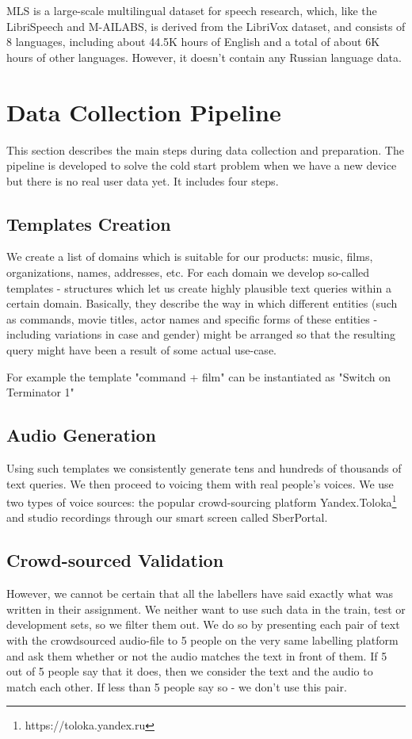 \documentclass[a4paper]{article}
\begin{document}
MLS \cite{pratap2020mls} is a large-scale multilingual dataset for speech research, which, like the LibriSpeech and M-AILABS, is derived from the LibriVox dataset, and consists of 8 languages, including about 44.5K hours of English and a total of about 6K hours of other languages. However, it doesn't contain any Russian language data.


\section{Data Collection Pipeline}

This section describes the main steps during data collection and preparation. The pipeline is developed to solve the cold start problem when we have a new device but there is no real user data yet. It includes four steps.

\subsection{Templates Creation}
We create a list of domains which is suitable for our products: music, films, organizations, names, addresses, etc.
For each domain we develop so-called templates - structures which let us create highly plausible text queries within a certain domain. Basically, they describe the way in which different entities (such as commands, movie titles, actor names and specific forms of these entities - including variations in case and gender) might be arranged so that the resulting query might have been a result of some actual use-case. 


For example the template "command + film" can be instantiated as "Switch on Terminator 1"


\subsection{Audio Generation}
Using such templates we consistently generate tens and hundreds of thousands of text queries. We then proceed to voicing them with real people's voices. We use two types of voice sources: the popular crowd-sourcing platform Yandex.Toloka\footnote{https://toloka.yandex.ru} and studio recordings through our smart screen called SberPortal.

\subsection{Crowd-sourced Validation}
However, we cannot be certain that all the labellers have said exactly what was written in their assignment. We neither want to use such data in the train, test or development sets, so we filter them out. We do so by presenting each pair of text with the crowdsourced audio-file to 5 people on the very same labelling platform and ask them whether or not the audio matches the text in front of them. If 5 out of 5 people say that it does, then we consider the text and the audio to match each other. If less than 5 people say so - we don't use this pair.
\end{document}
